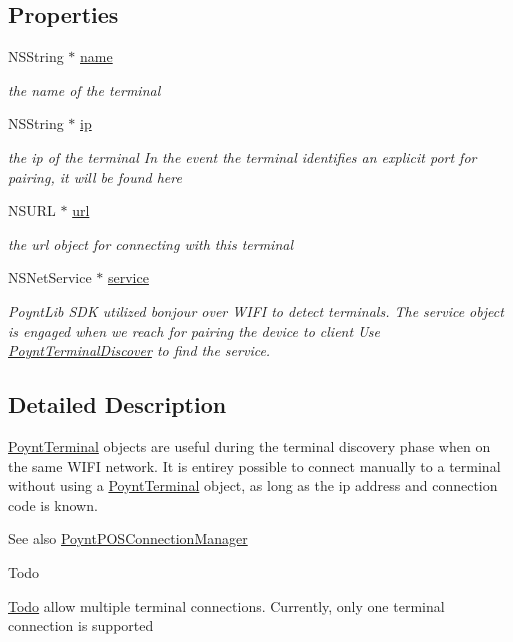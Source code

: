 \subsection*{Properties}
\begin{DoxyCompactItemize}
\item 
N\+S\+String $\ast$ \hyperlink{interface_poynt_terminal_a4b93d352d2fca75b34e1b5a50e03f587}{name}
\begin{DoxyCompactList}\small\item\em the name of the terminal \end{DoxyCompactList}\item 
N\+S\+String $\ast$ \hyperlink{interface_poynt_terminal_ab18eca4fc399814b2e86f54006b1e474}{ip}
\begin{DoxyCompactList}\small\item\em the ip of the terminal  In the event the terminal identifies an explicit port for pairing, it will be found here \end{DoxyCompactList}\item 
N\+S\+U\+RL $\ast$ \hyperlink{interface_poynt_terminal_a8d02094b967129e59efcc8c670677184}{url}
\begin{DoxyCompactList}\small\item\em the url object for connecting with this terminal \end{DoxyCompactList}\item 
N\+S\+Net\+Service $\ast$ \hyperlink{interface_poynt_terminal_a4c12c4a257de1f39c44a0a72b272246a}{service}
\begin{DoxyCompactList}\small\item\em Poynt\+Lib S\+DK utilized bonjour over W\+I\+FI to detect terminals. The service object is engaged when we reach for pairing the device to client  Use \hyperlink{interface_poynt_terminal_discover}{Poynt\+Terminal\+Discover} to find the service. \end{DoxyCompactList}\end{DoxyCompactItemize}


\subsection{Detailed Description}
\hyperlink{interface_poynt_terminal}{Poynt\+Terminal}  objects are useful during the terminal discovery phase when on the same W\+I\+FI network. It is entirey possible to connect manually to a terminal without using a \hyperlink{interface_poynt_terminal}{Poynt\+Terminal} object, as long as the ip address and connection code is known. \begin{DoxySeeAlso}{See also}
\hyperlink{interface_poynt_p_o_s_connection_manager}{Poynt\+P\+O\+S\+Connection\+Manager}
\end{DoxySeeAlso}
\begin{DoxyRefDesc}{Todo}
\item[\hyperlink{todo__todo000001}{Todo}]allow multiple terminal connections. Currently, only one terminal connection is supported \end{DoxyRefDesc}


